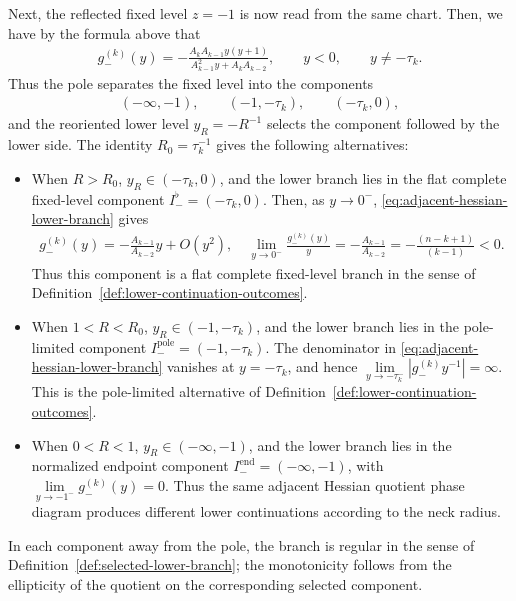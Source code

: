 \documentclass{amsart}
\theoremstyle{plain}
\theoremstyle{mainintrothm}
\theoremstyle{definition}
\begin{document}
	Next, the reflected fixed level $z=-1$ is now read from the same chart.  Then, we have by  the formula above that
	\begin{align}
		\label{eq:adjacent-hessian-lower-branch}
		g_-^{(k)}(y)
		=
		-\frac{A_kA_{k-1}y(y+1)}
		{A_{k-1}^2y+A_kA_{k-2}},
		\qquad
		y<0,
		\qquad
		y\ne-\tau_k .
	\end{align}
	Thus the pole separates the fixed level into the components
	\begin{align*}
		(-\infty,-1),
		\qquad
		(-1,-\tau_k),
		\qquad
		(-\tau_k,0),
	\end{align*}
	and the reoriented lower level $y_R=-R^{-1}$ selects the component followed by
	the lower side.  The identity $R_0=\tau_k^{-1}$ gives the following alternatives:
	\begin{itemize}
		\item 	When $R>R_0$, $y_R\in(-\tau_k,0)$, and the lower branch lies in the flat
		complete fixed-level component $I_-^\flat=(-\tau_k,0)$. Then, as $y\to0^-$, \eqref{eq:adjacent-hessian-lower-branch} gives
		\begin{align*}
			g_-^{(k)}(y)
			=
			-\frac{A_{k-1}}{A_{k-2}}y+O(y^2),
			\quad
			\lim\limits_{y\to0^-}
			\frac{g_-^{(k)}(y)}{y}
			=
			-\frac{A_{k-1}}{A_{k-2}}
			=
			-\frac{(n-k+1)}{(k-1)}<0.
		\end{align*}
		Thus this component is a flat complete fixed-level branch in the sense of
		Definition~\ref{def:lower-continuation-outcomes}.
		
		\item When $1<R<R_0$, $y_R\in(-1,-\tau_k)$, and the lower branch lies in the
		pole-limited component $I_-^{\mathrm{pole}}=(-1,-\tau_k)$. The denominator in \eqref{eq:adjacent-hessian-lower-branch} vanishes at
		$y=-\tau_k$, and hence $\lim\limits_{y\to-\tau_k^-}
			\left|g_-^{(k)}y^{-1}\right|=\infty$. This is the pole-limited alternative of Definition~\ref{def:lower-continuation-outcomes}.
		\item When $0<R<1$, $y_R\in(-\infty,-1)$, and the lower branch lies in the
		normalized endpoint component $I_-^{\mathrm{end}}=(-\infty,-1)$, with 
	$\lim\limits_{y\to-1^-}g_-^{(k)}(y)=0$. Thus the same adjacent Hessian quotient phase diagram produces different lower
		continuations according to the neck radius.  
	\end{itemize}
	In each component away from the
	pole, the branch is regular in the sense of
	Definition~\ref{def:selected-lower-branch}; the monotonicity follows from the
	ellipticity of the quotient on the corresponding selected component.
\end{document}
